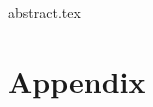 \documentclass[a4paper, english, fancyfoot, git]{mkessler-script}
\author{Maximilian Keßler}
\begin{document}
    \maketitle

    {abstract.tex}

    \cleardoublepage
    \tableofcontents

    \cleardoublepage
    \summaryoflectures

    \cleardoublepage

    \cleardoublepage
    \appendix
    \part{Appendix}

    

    \cleardoublepage
    \printvocabindex


    \cleardoublepage
    \printliterature
\end{document}

